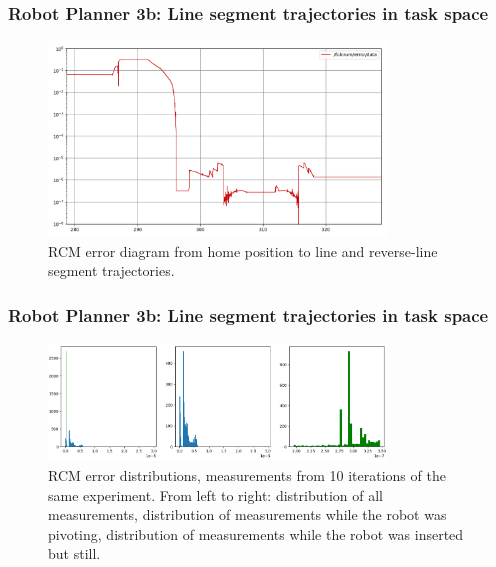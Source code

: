 \begin{frame}
\frametitle{Robot Planner 3b: Line segment trajectories in task space}
\begin{center}
\begin{figure}[!htb]
\centering
\includegraphics[width=0.8\textwidth]{../images/robot_planner3/robot_planner3b_error.png}
\caption{RCM error diagram from home position to line and reverse-line segment trajectories.}
\end{figure}
\end{center}
\end{frame}

\begin{frame}
\frametitle{Robot Planner 3b: Line segment trajectories in task space}
\begin{center}
\begin{figure}[!htb]
\centering
\includegraphics[width=0.8\textwidth]{../images/robot_planner3/robot_planner3b-error_distributions.png}
\caption{RCM error distributions, measurements from 10 iterations of the same experiment. From left to right: distribution of all measurements, distribution of measurements while the robot was pivoting, 
distribution of measurements while the robot was inserted but still.}
\end{figure}

\end{center}
\end{frame}

